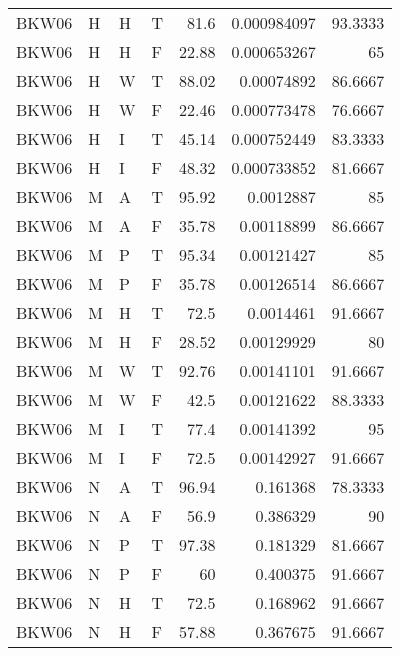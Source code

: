 \begin{longtable}{llllrrr}
    BKW06    & H     & H     & T          & 81.6       & 0.000984097 & 93.3333  \\
    BKW06    & H     & H     & F          & 22.88      & 0.000653267 & 65       \\
    BKW06    & H     & W     & T          & 88.02      & 0.00074892  & 86.6667  \\
    BKW06    & H     & W     & F          & 22.46      & 0.000773478 & 76.6667  \\
    BKW06    & H     & I     & T          & 45.14      & 0.000752449 & 83.3333  \\
    BKW06    & H     & I     & F          & 48.32      & 0.000733852 & 81.6667  \\
    BKW06    & M     & A     & T          & 95.92      & 0.0012887   & 85       \\
    BKW06    & M     & A     & F          & 35.78      & 0.00118899  & 86.6667  \\
    BKW06    & M     & P     & T          & 95.34      & 0.00121427  & 85       \\
    BKW06    & M     & P     & F          & 35.78      & 0.00126514  & 86.6667  \\
    BKW06    & M     & H     & T          & 72.5       & 0.0014461   & 91.6667  \\
    BKW06    & M     & H     & F          & 28.52      & 0.00129929  & 80       \\
    BKW06    & M     & W     & T          & 92.76      & 0.00141101  & 91.6667  \\
    BKW06    & M     & W     & F          & 42.5       & 0.00121622  & 88.3333  \\
    BKW06    & M     & I     & T          & 77.4       & 0.00141392  & 95       \\
    BKW06    & M     & I     & F          & 72.5       & 0.00142927  & 91.6667  \\
    BKW06    & N     & A     & T          & 96.94      & 0.161368    & 78.3333  \\
    BKW06    & N     & A     & F          & 56.9       & 0.386329    & 90       \\
    BKW06    & N     & P     & T          & 97.38      & 0.181329    & 81.6667  \\
    BKW06    & N     & P     & F          & 60         & 0.400375    & 91.6667  \\
    BKW06    & N     & H     & T          & 72.5       & 0.168962    & 91.6667  \\
    BKW06    & N     & H     & F          & 57.88      & 0.367675    & 91.6667  \\

\end{longtable}
